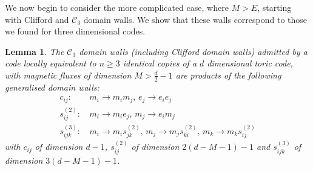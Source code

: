 \documentclass[pra,twocolumn,a4paper,nofootinbib]{revtex4-1}
\newtheorem{lem}{Lemma}
\begin{document}
We now begin to consider the more complicated case, where $M>E$, starting with Clifford and $\mathcal{C}_3$ domain walls. We show that these walls correspond to those we found for three dimensional codes.
\begin{lem}\label{l2}
The $\mathcal{C}_3$ domain walls (including Clifford domain walls) admitted by a code locally equivalent to $n \geq 3$ identical copies of a $d$ dimensional toric code, with magnetic fluxes of dimension $M>\frac{d}{2}-1$ are products of the following generalised domain walls:
\begin{align}
c_{ij}: & \, m_i \to m_im_j, \, e_j \to e_i e_j\\
s_{ij}^{(2)}: & \, m_i \to m_ie_j,\, m_j \to e_im_j\\
s_{ijk}^{(3)}: & \, m_i \to m_i s_{jk}^{(2)}, \, m_j \to m_j s_{ki}^{(2)}, \, m_k \to m_k s_{ij}^{(2)}
\end{align}
with $c_{ij}$ of dimension $d-1$, $s_{ij}^{(2)}$ of dimension $2(d-M-1)-1$ and $s_{ijk}^{(3)}$ of dimension $3(d-M-1)-1$.
\end{lem}
\end{document}
